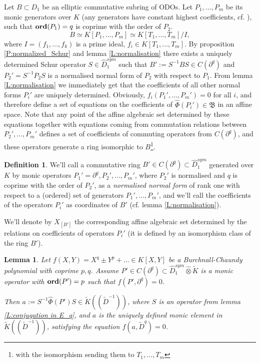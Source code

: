 \documentclass[11pt]{article}
\theoremstyle{definition}
\newcommand{\Ord}{\mathop {\rm \bf ord}}
\newtheorem{Def}{Definition}[section]
\theoremstyle{plain}
\newtheorem{lemma}{Lemma}[section]
\numberwithin{equation}{section}
\begin{document}
Let $B \subset D_1$ be an elliptic commutative subring of ODOs. Let $P_1, \ldots ,P_m$ be its monic generators over $K$ (any generators have constant highest coefficients, cf. \cite[Ch.3]{Zheglov_book}), such that $\Ord (P_1)=q$ is coprime with the order of $P_2$.
$$
B\simeq K[P_1,\ldots ,P_m]\simeq K[T_1,\ldots ,T_m]/I,
$$
where $I=(f_1,\ldots ,f_k)$ is a prime ideal, $f_i\in K[T_1,\ldots ,T_m]$. By  proposition \ref{P:normalized_Schur} and lemma \ref{L:normalisation} there exists a uniquely determined Schur operator $S\in \hat{D}_1^{sym}$ such that $B':=S^{-1}BS\in C(\partial^q)$ and $P_2'=S^{-1}P_2S$ is a normalised normal form of $P_2$ with respect to $P_1$. From lemma \ref{L:normalisation} we immediately get that the coefficients of all other normal forms $P_i'$ are uniquely determined. Obviously, $f_i(P_1', \ldots , P_m')=0$ for all $i$, and therefore define a set of equations on the coefficients of $\hat{\Phi}(P_i')\in \mathfrak{B}$ in an affine space. Note that any point of the affine algebraic set determined by these equations together with equations coming from commutation relations between $P_2', \ldots , P_m'$ 
defines a set of coefficients of commuting operators from $C(\partial^q)$, and these operators generate a ring isomorphic to $B$\footnote{with the isomorphism sending them to $T_1, \ldots ,T_m$}. 

\begin{Def}
\label{D:normalised_normal_form}
We'll call a commutative ring $B'\in C(\partial^q)\subset \hat{D}_1^{sym}$ generated over $K$ by monic operators $P_1'=\partial^q, P_2', \ldots, P_m'$, where $P_2'$ is normalised and $q$ is coprime with the order of $P_2'$,  as a {\it normalised normal form} of rank one with respect to a (ordered) set of generators $P_1',\ldots , P_m'$, and we'll call the coefficients of the operators $P_i'$ as coordinates of $B'$ (cf. lemma \ref{L:normalisation}). 

We'll denote by $X_{[B']}$ the corresponding affine algebraic set determined by the relations on coefficients of operators $P_i'$ (it is defined by an isomorphism class of the ring $B'$). 
\end{Def}

\begin{lemma}
\label{L:solution_of_BC_equation}
Let $f(X,Y) =  X^q\pm Y^p+\ldots \in K[X,Y]$ be a Burchnall-Chaundy polynomial with coprime $p,q$. Assume $P'\in C(\partial^q)\subset \hat{D}_1^{sym}\hat{\otimes}\tilde{K}$ is a monic operator with $\Ord (P')=p$ such that $f(P',\partial^q)=0$. 

Then $a:= S^{-1}\hat{\Phi}(P')S\in \tilde{K}((\tilde{D}^{-1}))$, where $S$ is an operator from lemma \ref{L:conjugation in E_q}, and $a$ is the uniquely defined monic element in $\tilde{K}((\tilde{D}^{-1}))$, satisfying the equation $f(a,\tilde{D}^q)=0$. 
\end{lemma}
\end{document}
